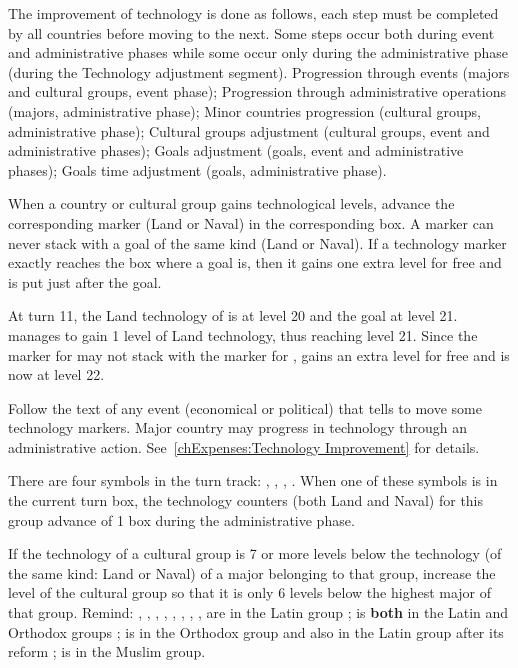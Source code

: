  The improvement of technology is done
as follows, each step must be completed by all countries before moving to the
next. Some steps occur both during event and administrative phases while some
occur only during the administrative phase (during the Technology adjustment
segment).
\bparag Progression through events (majors and cultural groups, event phase);
\bparag Progression through administrative operations (majors, administrative
phase);
\bparag Minor countries progression (cultural groups, administrative phase);
\bparag Cultural groups adjustment (cultural groups, event and administrative
phases);
\bparag Goals adjustment (goals, event and administrative phases);
\bparag Goals time adjustment (goals, administrative phase).

\aparag[Progression] When a country or cultural group gains technological
levels, advance the corresponding marker (Land or Naval) in the corresponding
box.
\bparag A marker can never stack with a goal of the same kind (Land or
Naval). If a technology marker exactly reaches the box where a goal is, then
it gains one extra level for free and is put just after the goal.

\begin{exemple}
  At turn 11, the Land technology of \FRA is at level 20 and the goal \TARQ at
  level 21. \FRA manages to gain 1 level of Land technology, thus reaching
  level 21. Since the marker for \FRA may not stack with the marker for \TARQ,
  \FRA gains an extra level for free and is now at level 22.
\end{exemple}

 Follow the text of any event (economical or
political) that tells to move some technology markers.
\bparag Major country may progress in technology through an administrative
action. See~\ref{chExpenses:Technology Improvement} for details.

 There are four symbols in the turn track:
\techlatin, \techislam, \techortho, \techrotw. When one of these symbols is in
the current turn box, the technology counters (both Land and Naval) for this
group advance of 1 box during the administrative phase.

\label{chExpenses:Technology:Cultural Adjustment}
If the technology of a cultural group is 7 or more levels below the technology
(of the same kind: Land or Naval) of a major belonging to that group, increase
the level of the cultural group so that it is only 6 levels below the highest
major of that group.
\bparag Remind: \POR, \SPA, \FRA, \ANG, \VEN, \HOL, \SUE, \AUS, \PRU are in
the Latin group ; \POL is \textbf{both} in the Latin and Orthodox groups ;
\RUS is in the Orthodox group and also in the Latin group after its reform ;
\TUR is in the Muslim group.

